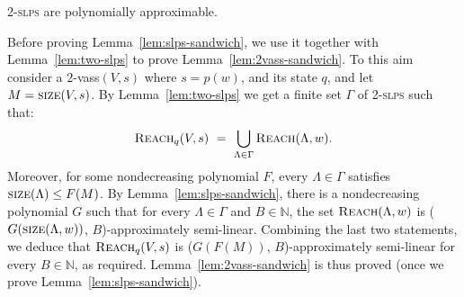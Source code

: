 \documentclass[a4paper, UKenglish, cleveref, autoref, thm-restate]{lipics-v2021}
\newcommand{\sandwich}{polynomially approximable\xspace}
\newcommand{\N}{\mathbb{N}}
\newcommand{\reach}{\textsc{Reach}}
\newcommand{\slps}{\textsc{slps}\xspace}
\newcommand{\size}{\textsc{size}}
\newcommand{\kanapka}[2]{(#1, #2)-approximately semi-linear}
\newcommand{\vass}{{\sc vass}\xspace}
\newcommand{\dslps}{2-\slps}
\newcommand{\dvass}{\parvass 2}
\newcommand{\parvass}[1]{{$#1$-\vass}\xspace}
\begin{document}
\begin{appendixproof}
\begin{lemma}\label{lem:slps-sandwich}
\dslps are \sandwich.
\end{lemma}

Before proving Lemma~\ref{lem:slps-sandwich}, we use it together with Lemma~\ref{lem:two-slps}
to prove Lemma~\ref{lem:2vass-sandwich}.
To this aim consider a \dvass $(V, s)$ where $s=p(w)$, and its state $q$, and let $M=\size(V,s)$.
By Lemma~\ref{lem:two-slps} we get a finite set $\Gamma$ of \dslps such that:
\[
\reach_q(V,s) \ = \ \bigcup_{\Lambda \in \Gamma} \reach(\Lambda, w).
\]
Moreover, for some nondecreasing polynomial $F$, every $\Lambda \in \Gamma$ satisfies
$\size(\Lambda) \leq F(M)$.
By Lemma~\ref{lem:slps-sandwich}, there is a nondecreasing polynomial $G$
such that for every $\Lambda \in \Gamma$ and $B\in\N$, 
the set $\reach(\Lambda,w)$
is 
\kanapka {$G(\size(\Lambda,w))$} {$B$}.
Combining the last two statements, we deduce that $\reach_q(V, s)$ is
\kanapka {$G(F(M))$} {$B$} for every $B\in\N$, as required.
Lemma~\ref{lem:2vass-sandwich} is thus proved (once we prove
Lemma~\ref{lem:slps-sandwich}).
\end{appendixproof}
\end{document}

